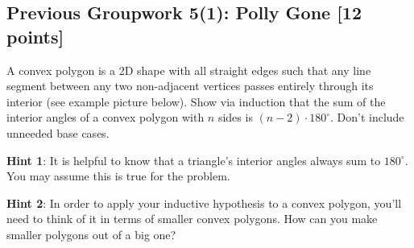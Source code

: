 \documentclass[12pt]{exam}
\begin{document}
\subsection*{Previous Groupwork 5(1): Polly Gone [12 points]}

A convex polygon is a 2D shape with all straight edges such that any line segment between any two non-adjacent vertices passes entirely through its interior (see example picture below). Show via induction that the sum of the interior angles of a convex polygon with $n$ sides is $(n - 2) \cdot 180^{\circ}$. Don't include unneeded base cases.

\begin{center}
\end{center}

\textbf{Hint 1}: It is helpful to know that a triangle's interior angles always sum to $180^{\circ}$. You may assume this is true for the problem.

\textbf{Hint 2}: In order to apply your inductive hypothesis to a convex polygon, you'll need to think of it in terms of smaller convex polygons. How can you make smaller polygons out of a big one?
\end{document}
